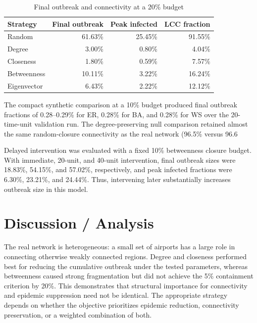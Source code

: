 \documentclass[conference]{IEEEtran}
\begin{document}
\begin{table}[t]
\caption{Final outbreak and connectivity at a 20\% budget}
\label{tab:strategies}
\centering
\begin{tabular}{lrrr}
\toprule
Strategy & Final outbreak & Peak infected & LCC fraction\\
\midrule
Random & 61.63\% & 25.45\% & 91.55\%\\
Degree & 3.00\% & 0.80\% & 4.04\%\\
Closeness & 1.80\% & 0.59\% & 7.57\%\\
Betweenness & 10.11\% & 3.22\% & 16.24\%\\
Eigenvector & 6.43\% & 2.22\% & 12.12\%\\
\bottomrule
\end{tabular}
\end{table}

The compact synthetic comparison at a 10\% budget produced final outbreak fractions of 0.28--0.29\% for ER, 0.28\% for BA, and 0.28\% for WS over the 20-time-unit validation run. The degree-preserving null comparison retained almost the same random-closure connectivity as the real network (96.5\% versus 96.6%

Delayed intervention was evaluated with a fixed 10\% betweenness closure budget. With immediate, 20-unit, and 40-unit intervention, final outbreak sizes were 18.83\%, 54.15\%, and 57.02\%, respectively, and peak infected fractions were 6.30\%, 23.21\%, and 24.44\%. Thus, intervening later substantially increases outbreak size in this model.

\section{Discussion / Analysis}
The real network is heterogeneous: a small set of airports has a large role in connecting otherwise weakly connected regions. Degree and closeness performed best for reducing the cumulative outbreak under the tested parameters, whereas betweenness caused strong fragmentation but did not achieve the 5\% containment criterion by 20\%. This demonstrates that structural importance for connectivity and epidemic suppression need not be identical. The appropriate strategy depends on whether the objective prioritizes epidemic reduction, connectivity preservation, or a weighted combination of both.
\end{document}
